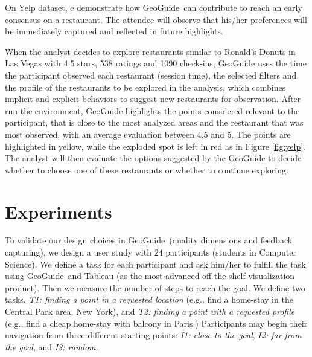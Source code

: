 \documentclass[conference,compsoc]{IEEEtran}
\newcommand{\framework}{{\sc GeoGuide}}
\begin{document}
\vspace{5pt}
 On Yelp dataset, e demonstrate how \framework\ can contribute to reach an early consensus on a restaurant. The attendee will observe that his/her preferences will be immediately captured and reflected in future highlights. 

When the analyst decides to explore restaurants similar to Ronald's Donuts in Las Vegas with 4.5 stars, 538 ratings and 1090 check-ins, GeoGuide uses the time the participant observed each restaurant (session time), the selected filters and the profile of the restaurants to be explored in the analysis, which combines implicit and explicit behaviors to suggest new restaurants for observation. After run the environment, GeoGuide highlights the points considered relevant to the participant, that is close to the most analyzed areas and the restaurant that was most observed, with an average evaluation between 4.5 and 5. The points are highlighted in yellow, while the exploded spot is left in red as in Figure  \ref{fig:yelp}. The analyst will then evaluate the options suggested by the GeoGuide to decide whether to choose one of these restaurants or whether to continue exploring.


%
%
%
%



\section{Experiments}
\label{sec:experiments}

\vspace{5pt}
To validate our design choices in \framework\ (quality dimensions and feedback capturing), we design a user study with $24$ participants (students in Computer Science). We define a task for each participant and ask him/her to fulfill the task using \framework\ and {\sc Tableau} (as the most advanced off-the-shelf visualization product). Then we measure the number of steps to reach the goal. We define two tasks, {\em T1: finding a point in a requested location} (e.g., find a home-stay in the Central Park area, New York), and {\em T2: finding a point with a requested profile} (e.g., find a cheap home-stay with balcony in Paris.) Participants may begin their navigation from three different starting points: {\em I1: close to the goal}, {\em I2: far from the goal}, and {\em I3: random}. 
\end{document}
